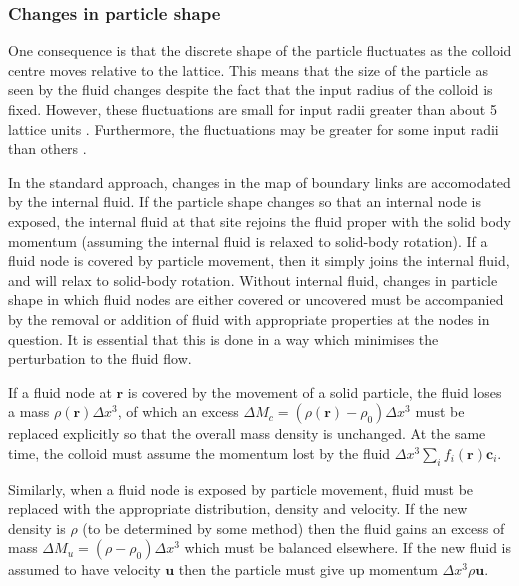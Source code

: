 \subsubsection{Changes in particle shape}

One consequence is that the discrete shape of the particle fluctuates
as the colloid centre moves relative to the
lattice. This means that the size of the particle as seen by the
fluid changes despite the fact that the input radius of the colloid
is fixed.  However, these fluctuations are small for input radii
greater than about 5 lattice units \cite{l96a}. Furthermore, the
fluctuations may be greater for some input radii than others
\cite{nl02}.


In the standard approach, changes in the map of boundary links
are accomodated by the internal fluid. If the particle shape
changes so that an internal node is exposed, the internal fluid
at that site rejoins the fluid proper with the solid body momentum
(assuming the internal fluid is relaxed to solid-body rotation).
If a fluid node is covered by particle movement, then it simply
joins the internal fluid, and will relax to solid-body rotation.
Without internal fluid, changes in particle shape
in which fluid nodes are either covered or uncovered must be
accompanied by the removal or addition
of fluid with appropriate properties at the nodes in question.
It is essential that this
is done in a way which minimises the perturbation to the fluid
flow.


If a fluid node at $\mathbf{r}$ is covered by the movement of a
solid particle,
the fluid loses a mass $\rho(\mathbf{r}) \Delta x^3$, of which an excess
$\Delta M_c = (\rho(\mathbf{r}) - \rho_0)\Delta x^3$ must be replaced
explicitly so that
the overall mass density is unchanged. At the same time, the
colloid must assume the momentum lost by the fluid
$\Delta x^3 \sum_i f_i(\mathbf{r}) \mathbf{c}_i$.

Similarly, when a fluid node is exposed by particle movement,
fluid must be replaced with the appropriate distribution, density
and velocity. If the
new density is $\rho$ (to be determined by some method) then
the fluid gains an excess of mass $\Delta M_u = (\rho - \rho_0)
\Delta x^3$ which must be balanced elsewhere. If the new fluid
is assumed to have velocity $\mathbf{u}$ then the particle must
give up momentum $\Delta x^3 \rho\mathbf{u}$.

